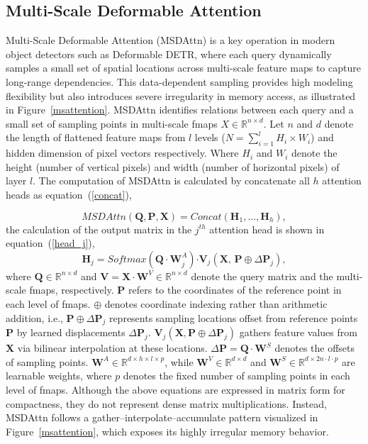 \documentclass[sigconf]{acmart}
\begin{document}
\subsection{Multi-Scale Deformable Attention}
\label{msda}
{
Multi-Scale Deformable Attention (MSDAttn) is a key operation in modern object detectors such as Deformable DETR, where each query dynamically samples a small set of spatial locations across multi-scale feature maps to capture long-range dependencies. 
This data-dependent sampling provides high modeling flexibility but also introduces severe irregularity in memory access, as illustrated in Figure~\ref{msattention}.} MSDAttn identifies relations between each query and a small set of sampling points in multi-scale fmaps $X \in \mathbb{R}^{n\times d}$. Let $n$ and $d$ denote the length of flattened feature maps from $l$ levels ($N = \sum_{i=1}^{l}H_i\times W_i$) and hidden dimension of pixel vectors respectively. Where $H_i$ and $W_i$ denote the height (number of vertical pixels) and width (number of horizontal pixels) of layer $l$. The computation of MSDAttn is calculated by concatenate all $h$ attention heads as equation~(\ref{concat}),

\vspace{-1em}
\begin{equation}
{MSDAttn}(\boldsymbol{Q}, \boldsymbol{P}, \boldsymbol{X}) = Concat(\boldsymbol{H}_1, ... , \boldsymbol{H}_h),
\label{concat}
\end{equation}
the calculation of the output matrix in the $j^{th}$ attention head is shown in equation~(\ref{head_j}),
\begin{equation}
\boldsymbol{H}_j = Softmax(\boldsymbol{Q\cdot W}_j^A) \boldsymbol{\cdot V}_j(\boldsymbol{X},\, {\boldsymbol{P} \oplus \Delta\boldsymbol{P}_j}),
\label{head_j}
\end{equation}
where $\boldsymbol{Q} \in \mathbb{R}^{n\times d}$ and $\boldsymbol{V} = \boldsymbol{X\cdot W}^V \in \mathbb{R}^{n\times d}$ denote the query matrix and the multi-scale fmaps, respectively. $\boldsymbol{P}$ refers to the coordinates of the reference point in each level of fmaps. 
{
$\oplus$ denotes coordinate indexing rather than arithmetic addition, 
i.e., $\boldsymbol{P} \oplus \Delta\boldsymbol{P}_j$ represents sampling locations offset from reference points $\boldsymbol{P}$ by learned displacements $\Delta\boldsymbol{P}_j$. 
$\boldsymbol{V}_j(\boldsymbol{X}, \boldsymbol{P} \oplus \Delta\boldsymbol{P}_j)$ gathers feature values from $\boldsymbol{X}$ via bilinear interpolation at these locations.
$\Delta\boldsymbol{P} = \boldsymbol{Q\cdot W}^S$ denotes the offsets of sampling points. $\boldsymbol{W}^A \in \mathbb{R}^{d\times h\times l\times p}$,}
while $\boldsymbol{W}^V \in \mathbb{R}^{d\times d}$ and $\boldsymbol{W}^S \in \mathbb{R}^{d\times 2n\cdot l\cdot p}$ are learnable weights, where $p$ denotes the fixed number of sampling points in each level of fmaps. {
Although the above equations are expressed in matrix form for compactness, they do not represent dense matrix multiplications. 
Instead, MSDAttn follows a gather–interpolate–accumulate pattern visualized in Figure~\ref{msattention}, which exposes its highly irregular memory behavior.}
\end{document}

